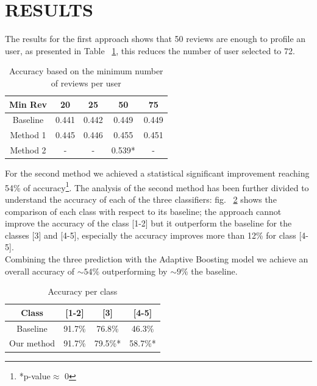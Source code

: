 \documentclass[11pt]{article}
\begin{document}
\section{RESULTS}
The results for the first approach shows that 50 reviews are enough to profile an user, as presented in Table ~\ref{tab}, this reduces the number of user selected to 72.\\
\begin{table}[]

	\caption{Accuracy based on the minimum number of reviews per user}
	\label{tab}
	\begin{tabular}{|c|c|c|c|c|}
		\hline
		Min Rev & 20    & 25    & 50     & 75    \\ \hline
		Baseline    & 0.441 & 0.442 & 0.449  & 0.449 \\ \hline
		Method 1    & 0.445 & 0.446 & 0.455  & 0.451 \\ \hline
		Method 2    & -     & -     & 0.539* & -     \\ \hline
	\end{tabular}
\end{table}
For the second method we achieved a statistical significant improvement reaching 54\% of accuracy\footnote{*p-value$\approx$ 0}. The analysis of the second method has been further divided to understand the accuracy of each of the three classifiers:
fig. ~\ref{class} shows the comparison of each class with respect to its baseline; the approach cannot improve the accuracy of the class [1-2] but it outperform the baseline for the classes [3] and [4-5], especially the accuracy improves more than 12\% for class [4-5].\\
Combining the three prediction with the Adaptive Boosting model we achieve an overall accuracy of $\sim 54\%$ outperforming by $\sim 9\%$ the baseline.
\begin{table}[]
	\centering
	\caption{Accuracy per class}
	\label{class}
	\begin{tabular}{|c|c|c|c|}
		\hline
		Class      & {[}1-2{]} & {[}3{]} & {[}4-5{]} \\ \hline
		Baseline   & 91.7\%    & 76.8\%  & 46.3\%    \\ \hline
		Our method & 91.7\%    & 79.5\%*  & 58.7\%*    \\ \hline
	\end{tabular}
\end{table}
\end{document}
